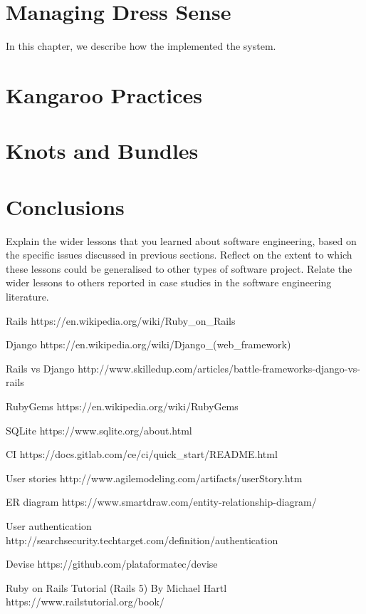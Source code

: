 \documentclass{l3proj}
\begin{document}
\section{Managing Dress Sense}
\label{managing}

In this chapter, we describe how the implemented the system.

\section{Kangaroo Practices}



\section{Knots and Bundles}
\label{sec:managing}


\section{Conclusions}

Explain the wider lessons that you learned about software engineering,
based on the specific issues discussed in previous sections.  Reflect
on the extent to which these lessons could be generalised to other
types of software project.  Relate the wider lessons to others
reported in case studies in the software engineering literature.




\label{tech}
Rails
https://en.wikipedia.org/wiki/Ruby_on_Rails

Django
https://en.wikipedia.org/wiki/Django_(web_framework)

Rails vs Django
http://www.skilledup.com/articles/battle-frameworks-django-vs-rails

RubyGems
https://en.wikipedia.org/wiki/RubyGems

SQLite
https://www.sqlite.org/about.html

\label{testing}
CI 
https://docs.gitlab.com/ce/ci/quick_start/README.html

\label{user_stories}

User stories
http://www.agilemodeling.com/artifacts/userStory.htm


\label{er}
ER diagram
https://www.smartdraw.com/entity-relationship-diagram/

\label{authentication}
User authentication
http://searchsecurity.techtarget.com/definition/authentication

Devise
https://github.com/plataformatec/devise

Ruby on Rails Tutorial (Rails 5) By Michael Hartl
https://www.railstutorial.org/book/
\end{document}
